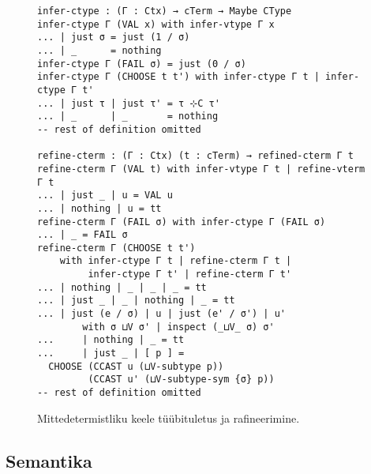 \documentclass[a4paper,12pt]{article}
\begin{document}
\begin{figure}
  \begin{BVerbatim}
infer-ctype : (Γ : Ctx) → cTerm → Maybe CType
infer-ctype Γ (VAL x) with infer-vtype Γ x
... | just σ = just (1 / σ)
... | _      = nothing
infer-ctype Γ (FAIL σ) = just (0 / σ)
infer-ctype Γ (CHOOSE t t') with infer-ctype Γ t | infer-ctype Γ t'
... | just τ | just τ' = τ ⊹C τ'
... | _      | _       = nothing
-- rest of definition omitted

refine-cterm : (Γ : Ctx) (t : cTerm) → refined-cterm Γ t
refine-cterm Γ (VAL t) with infer-vtype Γ t | refine-vterm Γ t
... | just _ | u = VAL u
... | nothing | u = tt 
refine-cterm Γ (FAIL σ) with infer-ctype Γ (FAIL σ)
... | _ = FAIL σ
refine-cterm Γ (CHOOSE t t')
    with infer-ctype Γ t | refine-cterm Γ t |
         infer-ctype Γ t' | refine-cterm Γ t'
... | nothing | _ | _ | _ = tt
... | just _ | _ | nothing | _ = tt
... | just (e / σ) | u | just (e' / σ') | u'
        with σ ⊔V σ' | inspect (_⊔V_ σ) σ'
...     | nothing | _ = tt
...     | just _ | [ p ] =
  CHOOSE (CCAST u (⊔V-subtype p))
         (CCAST u' (⊔V-subtype-sym {σ} p))
-- rest of definition omitted
  \end{BVerbatim}
  \caption{Mittedetermistliku keele tüübituletus ja rafineerimine.}
  \label{fig:nd.refine}
\end{figure}


\subsection{Semantika}
\end{document}
